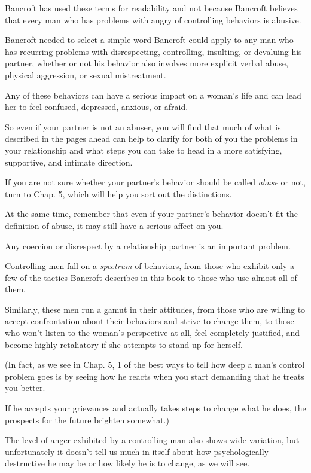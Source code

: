 \documentclass[oneside]{article}
\numberwithin{equation}{section}
\begin{document}
Bancroft has used these terms for readability and not because Bancroft believes that every man who has problems with angry of controlling behaviors is abusive.

Bancroft needed to select a simple word Bancroft could apply to any man who has recurring problems with disrespecting, controlling, insulting, or devaluing his partner, whether or not his behavior also involves more explicit verbal abuse, physical aggression, or sexual mistreatment.

Any of these behaviors can have a serious impact on a woman's life and can lead her to feel confused, depressed, anxious, or afraid.

So even if your partner is not an abuser, you will find that much of what is described in the pages ahead can help to clarify for both of you the problems in your relationship and what steps you can take to head in a more satisfying, supportive, and intimate direction.

If you are not sure whether your partner's behavior should be called \textit{abuse} or not, turn to Chap. 5, which will help you sort out the distinctions.

%
At the same time, remember that even if your partner's behavior doesn't fit the definition of abuse, it may still have a serious affect on you.

Any coercion or disrespect by a relationship partner is an important problem.

Controlling men fall on a \textit{spectrum} of behaviors, from those who exhibit only a few of the tactics Bancroft describes in this book to those who use almost all of them.

Similarly, these men run a gamut in their attitudes, from those who are willing to accept confrontation about their behaviors and strive to change them, to those who won't listen to the woman's perspective at all, feel completely justified, and become highly retaliatory if she attempts to stand up for herself.

(In fact, as we see in Chap. 5, 1 of the best ways to tell how deep a man's control problem goes is by seeing how he reacts when you start demanding that he treats you better.

If he accepts your grievances and actually takes steps to change what he does, the prospects for the future brighten somewhat.)

The level of anger exhibited by a controlling man also shows wide variation, but unfortunately it doesn't tell us much in itself about how psychologically destructive he may be or how likely he is to change, as we will see.
\end{document}
